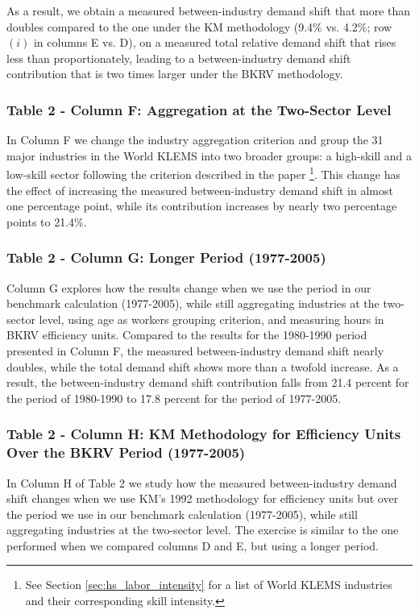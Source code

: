 \documentclass[10pt]{article}
\begin{document}
As a result, we obtain a measured between-industry demand shift that more than doubles compared to the one under the KM methodology (9.4\% vs. 4.2\%; row $(i)$ in columns E vs. D), on a measured total relative demand shift that rises less than proportionately, leading to a between-industry demand shift contribution that is two times larger under the BKRV methodology.

\subsubsection*{Table 2 - Column F: Aggregation at the Two-Sector Level}
In Column F we change the industry aggregation criterion and group the 31 major industries in the World KLEMS into two broader groups: a high-skill and a low-skill sector following the criterion described in the paper \footnote{See Section \ref{sec:hs_labor_intensity} for a list of World KLEMS industries and their corresponding skill intensity.}. This change has the effect of increasing the measured between-industry demand shift in almost one percentage point, while its contribution increases by nearly two percentage points to 21.4\%.

\subsubsection*{Table 2 - Column G: Longer Period (1977-2005)}
Column G explores how the results change when we use the period in our benchmark calculation (1977-2005), while still aggregating industries at the two-sector level, using age as workers grouping criterion, and measuring hours in BKRV efficiency units. Compared to the results for the 1980-1990 period presented in Column F, the measured between-industry demand shift nearly doubles, while the total demand shift shows more than a twofold increase. As a result, the between-industry demand shift contribution falls from 21.4 percent for the period of 1980-1990 to 17.8 percent for the period of 1977-2005.

\subsubsection*{Table 2 - Column H: KM Methodology for Efficiency Units Over the BKRV Period (1977-2005)}
In Column H of Table 2 we study how the measured between-industry demand shift changes when we use KM's 1992 methodology for efficiency units but over the period we use in our benchmark calculation (1977-2005), while still aggregating industries at the two-sector level. The exercise is similar to the one performed when we compared columns D and E, but using a longer period.\\
\end{document}
